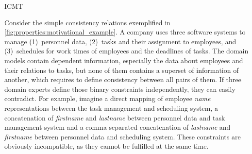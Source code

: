 \begin{copiedFrom}{ICMT}

Consider the simple consistency relations exemplified in \autoref{fig:properties:motivational_example}.
A company uses three software systems to manage (1)~personnel data, (2)~tasks and their assignment to employees, and (3)~schedules for work times of employees and the deadlines of tasks.
The domain models contain dependent information, especially the data about employees and their relations to tasks, but none of them contains a superset of information of another, which requires to define consistency between all pairs of them.
If three domain experts define %
those binary constraints
independently, they can easily contradict. 
For example, imagine %
a direct mapping of employee \emph{name} representations between the task management and scheduling system, a concatenation of \emph{firstname} and \emph{lastname} between personnel data and task management system and a comma-separated concatenation of \emph{lastname} and \emph{firstname} between personnel data and scheduling system.
These constraints are obviously incompatible, as they cannot be fulfilled at the same time.


\end{copiedFrom}
